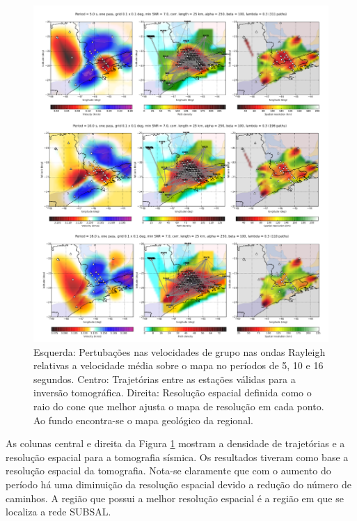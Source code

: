 \begin{figure}[!ht]
\centering
\includegraphics[scale=0.45]{Figs/mapa_tomografia.png}
\caption[Mosaico contendo as pertubações nas velocidades de grupo, trajetórias entre as estações e a resolução espacial.]{Esquerda: Pertubações nas velocidades de grupo nas ondas Rayleigh relativas a velocidade média sobre o mapa no períodos de 5, 10 e 16 segundos. Centro: Trajetórias entre as estações válidas para a inversão tomográfica. Direita: Resolução espacial definida como o raio do cone que melhor ajusta o mapa de resolução em cada ponto. Ao fundo encontra-se o mapa geológico da regional.}
\label{tomografia}
\end{figure}

As colunas central e direita da Figura \ref{tomografia} mostram a densidade de trajetórias e a resolução espacial para a tomografia sísmica. Os resultados tiveram como base a resolução espacial da tomografia. Nota-se claramente que com o aumento do período há uma diminuição da resolução espacial devido a redução do número de caminhos. A região que possui a melhor resolução espacial é a região em que se localiza a rede SUBSAL.

\pagebreak
